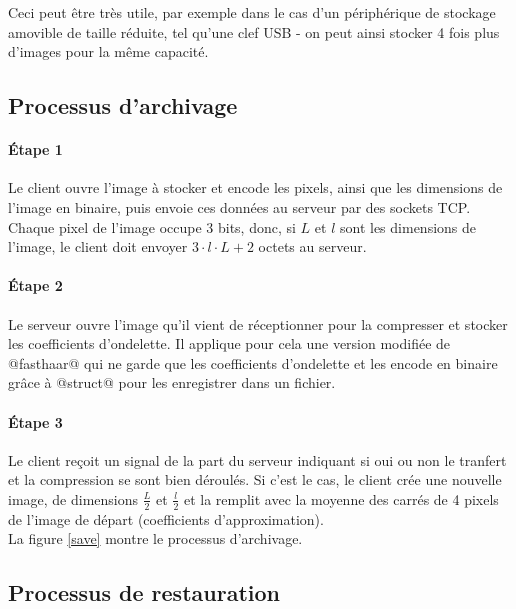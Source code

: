 \documentclass{article}
\begin{document}
Ceci peut être très utile, par exemple dans le cas d'un périphérique de stockage amovible de taille réduite, tel qu'une clef USB - on peut ainsi stocker 4 fois plus d'images pour la même capacité.


\subsection{Processus d'archivage}

\paragraph{Étape 1}

Le client ouvre l'image à stocker et encode les pixels, ainsi que les dimensions de l'image en binaire, puis envoie ces données au serveur par des sockets TCP. Chaque pixel de l'image occupe 3 bits, donc, si $L$ et $l$ sont les dimensions de l'image, le client doit envoyer $3\cdot{}l\cdot{}L + 2$ octets au serveur.

\paragraph{Étape 2}

Le serveur ouvre l'image qu'il vient de réceptionner pour la compresser et stocker les coefficients d'ondelette. Il applique pour cela une version modifiée de @fasthaar@ qui ne garde que les coefficients d'ondelette et les encode en binaire grâce à @struct@ pour les enregistrer dans un fichier.

\paragraph{Étape 3}

Le client reçoit un signal de la part du serveur indiquant si oui ou non le tranfert et la compression se sont bien déroulés. Si c'est le cas, le client crée une nouvelle image, de dimensions $\frac{L}{2}$ et $\frac{l}{2}$ et la remplit avec la moyenne des carrés de 4 pixels de l'image de départ (coefficients d'approximation). \\


La figure \ref{save} montre le processus d'archivage.



\subsection{Processus de restauration}
\end{document}
